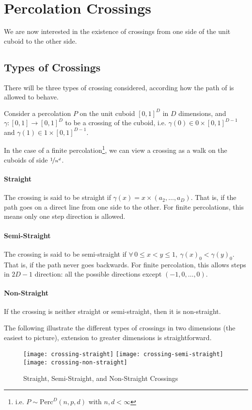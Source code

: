 \section{Percolation Crossings}
We are now interested in the existence of crossings from one side of the unit cuboid to the other side.

\subsection{Types of Crossings}
There will be three types of crossing considered, according how the path of is allowed to behave.

Consider a percolation $P$ on the unit cuboid $\left[ 0,1 \right]^D$ in $D$ dimensions, and $\gamma: \left[ 0,1 \right] \to \left[ 0,1 \right]^D$ to be a crossing of the cuboid, i.e. $\gamma(0) \in 0 \times \left[ 0,1 \right]^{D-1}$ and $\gamma(1) \in 1 \times \left[ 0,1 \right]^{D-1}$.

In the case of a finite percolation\footnote{i.e. $P \sim \text{Perc}^D(n,p,d)$ with $n,d < \infty$}, we can view a crossing as a walk on the cuboids of side $\nicefrac{1}{n^d}$.

\paragraph{Straight}
The crossing is said to be straight if $\gamma(x) = x \times (a_2,\dots,a_D)$.
That is, if the path goes on a direct line from one side to the other.
For finite percolations, this means only one step direction is allowed.

\paragraph{Semi-Straight}
The crossing is said to be semi-straight if $\forall \, 0 \leq x < y \leq 1, \ \gamma(x)_0 < \gamma(y)_0$.
That is, if the path never goes backwards.
For finite percolation, this allows steps in $2D-1$ direction: all the possible directions except $(-1,0,\dots,0)$.

\paragraph{Non-Straight}
If the crossing is neither straight or semi-straight, then it is non-straight.

The following illustrate the different types of crossings in two dimensions (the easiest to picture), extension to greater dimensions is straightforward.
\begin{figure}[h]
	\texttt{[image: crossing-straight]}
	\hspace{0.15cm}
	\texttt{[image: crossing-semi-straight]}
	\hspace{0.15cm}
	\texttt{[image: crossing-non-straight]}
	\centering
	\caption{Straight, Semi-Straight, and Non-Straight Crossings}
	\label{fig:crossingTypes}
\end{figure}

